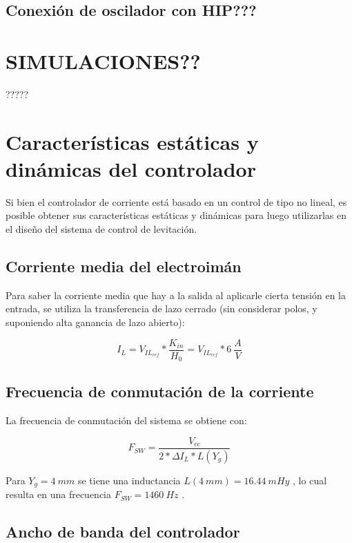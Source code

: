 \subsection{Conexión de oscilador con HIP???}

\section{SIMULACIONES??}

?????

\section{Características estáticas y dinámicas del controlador}

Si bien el controlador de corriente está basado en un control de tipo no lineal, es posible obtener sus características estáticas y dinámicas para luego utilizarlas en el diseño del sistema de control de levitación.

\subsection{Corriente media del electroimán}

\noindent Para saber la corriente media que hay a la salida al aplicarle cierta tensión en la entrada, se utiliza la transferencia de lazo cerrado (sin considerar polos, y suponiendo alta ganancia de lazo abierto):

\begin{equation} 
I_L = V_{IL_{ref}} * \frac{K_{in}}{H_0} = V_{IL_{ref}} * 6\:\frac{A}{V}
\end{equation}

\subsection{Frecuencia de conmutación de la corriente}

\noindent La frecuencia de conmutación del sistema se obtiene con:

\begin{equation}\label{eq_frec-sw} 
F_{SW} = \frac{V_{cc}}{2*\Delta I_L * L(Y_g)}
\end{equation}

\noindent Para $Y_g = 4 \:mm $ se tiene una inductancia $L(4\:mm) = 16.44 \:mHy$ , lo cual resulta en una frecuencia $F_{SW }= 1460 \:Hz$ .

\subsection{Ancho de banda del controlador}\label{esccion_AB_Controlador} 

